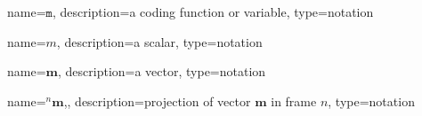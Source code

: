 

\newcommand{\cross}{\times}

	\newcommand{\code}[1]{\ensuremath{\texttt{#1}}}
	{%
		name=\code{m},
		description=a coding function or variable,
		type=notation
	}

	\newcommand{\der}{\ensuremath{\mathrm{d}}}

	{%
		name=\ensuremath{m},
		description=a scalar,
		type=notation
	}

	\renewcommand{\vec}[1]{\ensuremath{\boldsymbol{#1}}}
	{%
		name=\vec{m},
		description=a vector,
		type=notation
	}

	\newcommand{\project}[2]{\ensuremath{{}^{#2}\!{#1}}}
	{%
		name=\project{\vec{m}}{n},,
		description=projection of vector \vec{m} in frame $n$,
		type=notation
	}

